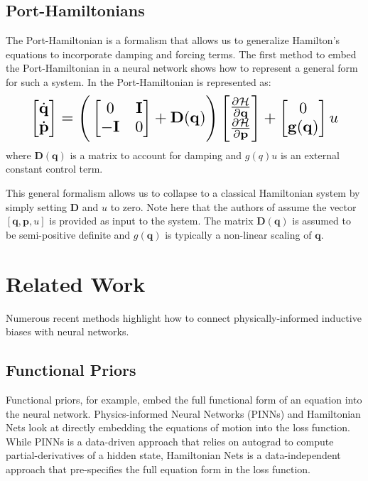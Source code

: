 \documentclass[twoside]{article}
\begin{document}
\subsection{Port-Hamiltonians}

The Port-Hamiltonian is a formalism that allows us to generalize Hamilton's equations to incorporate damping and forcing terms. The first method to embed the Port-Hamiltonian in a neural network \cite{zhong_dissipative_2020} shows how to represent a general form for such a system. In \cite{zhong_dissipative_2020} the Port-Hamiltonian is represented as:
\begin{equation}
\resizebox{0.9\linewidth}{!}{$%
\begin{bmatrix}
\dot{\mathbf{q}} \\
\dot{\mathbf{p}}
\end{bmatrix}
=
\Bigg(\begin{bmatrix}
0 & \mathbf{I} \\
-\mathbf{I} & 0
\end{bmatrix} +
\mathbf{D}(\mathbf{q})
 \Bigg)
 \begin{bmatrix}
\frac{\partial \mathcal{H}}{\partial \mathbf{q}} \\
\frac{\partial \mathcal{H}}{\partial \mathbf{p}}
\end{bmatrix}
+
\begin{bmatrix}
0 \\
\mathbf{g}(\mathbf{q})
\end{bmatrix}
u
$%
}%
\label{eqn.pham}
\end{equation}
where $\mathbf{D}(\mathbf{q})$ is a matrix to account for damping and $g(q)u$ is an external constant control term. 

This general formalism allows us to collapse to a classical Hamiltonian system by simply setting $\mathbf{D}$ and $u$ to zero. Note here that the authors of \cite{zhong_dissipative_2020} assume the vector $[\mathbf{q},\mathbf{p},u]$ is provided as input to the system. The matrix $\mathbf{D}(\mathbf{q})$ is assumed to be semi-positive definite and $g(\mathbf{q})$ is typically a non-linear scaling of $\mathbf{q}$.

\section{Related Work}

Numerous recent methods highlight how to connect physically-informed inductive biases with neural networks.

\subsection*{Functional Priors}
Functional priors, for example, embed the full functional form of an equation into the neural network. Physics-informed Neural Networks (PINNs) \cite{raissi_physics_2017,raissi_physics-informed_2019} and Hamiltonian Nets \cite{mattheakis_hamiltonian_2020} look at directly embedding the equations of motion into the loss function. While PINNs is a data-driven approach that relies on autograd to compute partial-derivatives of a hidden state, Hamiltonian Nets is a data-independent approach that pre-specifies the full equation form in the loss function.
\end{document}
